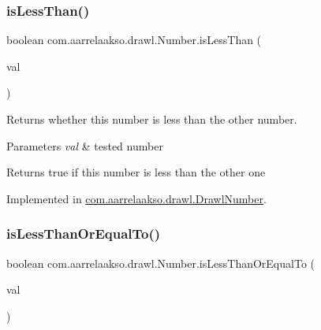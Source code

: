 \subsubsection{\texorpdfstring{is\+Less\+Than()}{isLessThan()}\hspace{0.1cm}{\footnotesize\ttfamily [2/2]}}
{\footnotesize\ttfamily boolean com.\+aarrelaakso.\+drawl.\+Number.\+is\+Less\+Than (\begin{DoxyParamCaption}\item[{final double}]{val }\end{DoxyParamCaption})}



Returns whether this number is less than the other number. 


\begin{DoxyParams}{Parameters}
{\em val} & tested number \\
\hline
\end{DoxyParams}
\begin{DoxyReturn}{Returns}
true if this number is less than the other one 
\end{DoxyReturn}


Implemented in \hyperlink{classcom_1_1aarrelaakso_1_1drawl_1_1_drawl_number_a01bc433270b27f6b50ea59fd0d5fcc90}{com.\+aarrelaakso.\+drawl.\+Drawl\+Number}.

\mbox{\label{interfacecom_1_1aarrelaakso_1_1drawl_1_1_number_a195d37075fcef873df2907194e794836}} 
\subsubsection{\texorpdfstring{is\+Less\+Than\+Or\+Equal\+To()}{isLessThanOrEqualTo()}\hspace{0.1cm}{\footnotesize\ttfamily [1/2]}}
{\footnotesize\ttfamily boolean com.\+aarrelaakso.\+drawl.\+Number.\+is\+Less\+Than\+Or\+Equal\+To (\begin{DoxyParamCaption}\item[{@Not\+Null final \hyperlink{interfacecom_1_1aarrelaakso_1_1drawl_1_1_number}{Number}}]{val }\end{DoxyParamCaption})}



